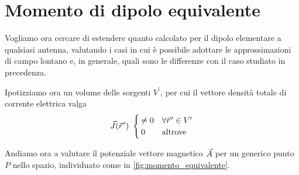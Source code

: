

\section{Momento di dipolo equivalente}
Vogliamo ora cercare di estendere quanto calcolato per il dipolo elementare a qualsiasi antenna, valutando i casi in cui è possibile adottare le approssimazioni di campo lontano e, in generale, quali sono le differenze con il caso studiato in precedenza.

Ipotizziamo ora un volume delle sorgenti $V^\prime$, per cui il vettore densità totale di corrente elettrica valga
\begin{equation}
	\J(\rp) ~ \begin{cases}
		\neq 0 & \forall \rp \in V^\prime \\ 0 & \text{altrove}
	\end{cases}
\end{equation}

Andiamo ora a valutare il potenziale vettore magnetico $\vec{A}$ per un generico punto $P$ nello spazio, individuato come in \autoref{fig:momento_equivalente}.

